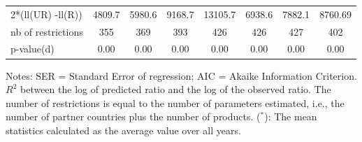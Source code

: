 \documentclass[a4paper,11pt]{article}
\begin{document}
\begin{table}[htbp]
{\begin{center}
\begin{tabular}{l|cccccc|c}
    2*(ll(UR) -ll(R)) & 4809.7 & 5980.6 & 9168.7 & 13105.7 & \multicolumn{1}{c}{6938.6} & \multicolumn{1}{c}{7882.1} & 8760.69 \\
    nb of restrictions & 355   & 369   & 393   & 426   & \multicolumn{1}{c}{426} & \multicolumn{1}{c}{427} & 402 \\
    p-value(d) & 0.00 & 0.00 & 0.00 & 0.00 & \multicolumn{1}{c}{0.00} & \multicolumn{1}{c}{0.00} & 0.00 \\
    \hline \hline
 \end{tabular}%
    \end{center}}
  \label{tab:good_fit_air}%
 \parbox[l]{12cm}{\tiny{Notes: SER = Standard Error of regression; AIC = Akaike Information Criterion. $R^{2}$ between the log of predicted ratio and the log of the observed ratio. The number of restrictions is equal to the number of parameters estimated, i.e., the number of partner countries plus the number of products. ($^\ast$): The mean statistics calculated as the average value over all years. }}
\end{table}%
\end{document}
